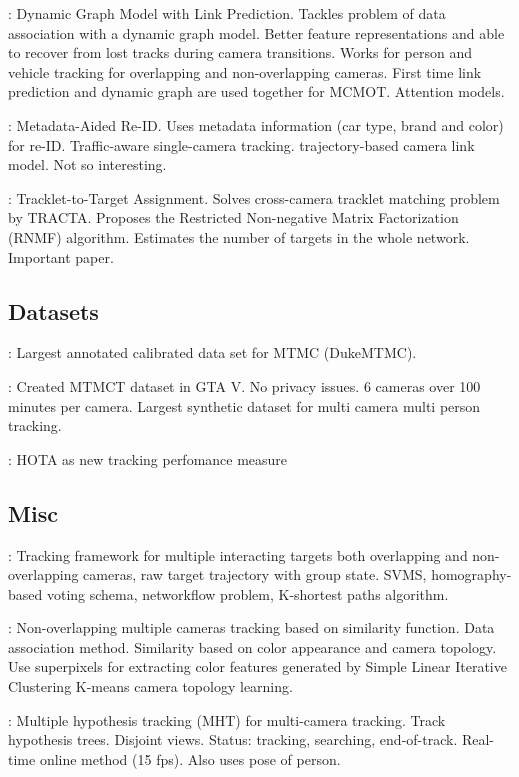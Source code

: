 \cite{Quach21}: Dynamic Graph Model with Link Prediction. Tackles problem of data association with a dynamic graph model. Better feature representations and able to recover from lost tracks during camera transitions. Works for person and vehicle tracking for overlapping and non-overlapping cameras. First time link prediction and dynamic graph are used together for MCMOT. Attention models.

\cite{Hsu21}: Metadata-Aided Re-ID. Uses metadata information (car type, brand and color) for re-ID. Traffic-aware single-camera tracking. trajectory-based camera link model. Not so interesting.

\cite{He20a}: Tracklet-to-Target Assignment. Solves cross-camera tracklet matching problem by TRACTA. Proposes the Restricted Non-negative Matrix Factorization (RNMF) algorithm. Estimates the number of targets in the whole network. Important paper.

\subsection{Datasets}

\cite{Ristani16}: Largest annotated calibrated data set for MTMC (DukeMTMC).

\cite{Koehl20}: Created MTMCT dataset in GTA V. No privacy issues. 6 cameras over 100 minutes per camera. Largest synthetic dataset for multi camera multi person tracking.

\cite{Luiten20}: HOTA as new tracking perfomance measure

\subsection{Misc}

\cite{Zhang15a}: Tracking framework for multiple interacting targets both overlapping and non-overlapping cameras, raw target trajectory with group state. SVMS, homography-based voting schema, networkflow problem, K-shortest paths algorithm.

\cite{Choi16}: Non-overlapping multiple cameras tracking based on similarity function. Data association method. Similarity based on color appearance and camera topology. Use superpixels for extracting color features generated by Simple Linear Iterative Clustering K-means camera topology learning.

\cite{Yoon18}: Multiple hypothesis tracking (MHT) for multi-camera tracking. Track hypothesis trees. Disjoint views. Status: tracking, searching, end-of-track. Real-time online method (15 fps). Also uses pose of person.

